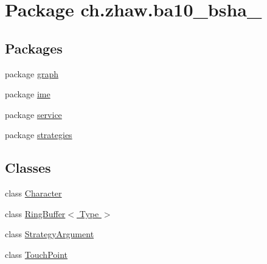 \hypertarget{namespacech_1_1zhaw_1_1ba10__bsha__1}{
\section{Package ch.zhaw.ba10\_\-bsha\_}
\label{namespacech_1_1zhaw_1_1ba10__bsha__1}
}
\subsection*{Packages}
\begin{DoxyCompactItemize}
\item 
package \hyperlink{namespacech_1_1zhaw_1_1ba10__bsha__1_1_1graph}{graph}
\item 
package \hyperlink{namespacech_1_1zhaw_1_1ba10__bsha__1_1_1ime}{ime}
\item 
package \hyperlink{namespacech_1_1zhaw_1_1ba10__bsha__1_1_1service}{service}
\item 
package \hyperlink{namespacech_1_1zhaw_1_1ba10__bsha__1_1_1strategies}{strategies}
\end{DoxyCompactItemize}
\subsection*{Classes}
\begin{DoxyCompactItemize}
\item 
class \hyperlink{classch_1_1zhaw_1_1ba10__bsha__1_1_1Character}{Character}
\item 
class \hyperlink{classch_1_1zhaw_1_1ba10__bsha__1_1_1RingBuffer_3_01Type_01_4}{RingBuffer$<$ Type $>$}
\item 
class \hyperlink{classch_1_1zhaw_1_1ba10__bsha__1_1_1StrategyArgument}{StrategyArgument}
\item 
class \hyperlink{classch_1_1zhaw_1_1ba10__bsha__1_1_1TouchPoint}{TouchPoint}
\end{DoxyCompactItemize}
